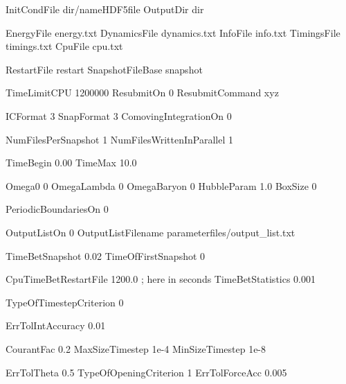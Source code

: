 InitCondFile 	 dir/nameHDF5file
OutputDir      	 dir

EnergyFile        energy.txt
DynamicsFile      dynamics.txt
InfoFile          info.txt
TimingsFile       timings.txt
CpuFile           cpu.txt

RestartFile       restart
SnapshotFileBase  snapshot





TimeLimitCPU      1200000       
ResubmitOn        0
ResubmitCommand   xyz



ICFormat                 3	%
SnapFormat               3
ComovingIntegrationOn    0

NumFilesPerSnapshot       1
NumFilesWrittenInParallel 1




TimeBegin           0.00
TimeMax	            10.0

Omega0	              0
OmegaLambda           0
OmegaBaryon           0
HubbleParam         1.0
BoxSize               0

PeriodicBoundariesOn     0


OutputListOn             0
OutputListFilename    parameterfiles/output_list.txt

TimeBetSnapshot        0.02
TimeOfFirstSnapshot    0

CpuTimeBetRestartFile     1200.0    ; here in seconds
TimeBetStatistics         0.001




	
TypeOfTimestepCriterion  0	

ErrTolIntAccuracy      0.01      %

CourantFac             0.2      %
MaxSizeTimestep        1e-4
MinSizeTimestep        1e-8	%




ErrTolTheta            0.5            
TypeOfOpeningCriterion 1
ErrTolForceAcc         0.005



